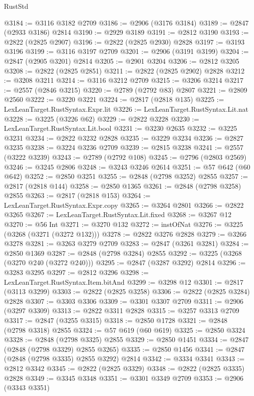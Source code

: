 \begin{lexlean}{RustStd}
\begin{coremodule}
@3184 := @3116 @3182 @2709
@3186 := @2906 (@3176 @3184)
@3189 := @2847 (@2933 @3186) @2814
@3190 := @2929 @3189
@3191 := @2812 @3190
@3193 := @2822 (@2825 @2907)
@3196 := @2822 (@2825 @2930) @2828
@3197 := @3193 @3196
@3199 := @3116 @3197 @2709
@3201 := @2906 (@3191 @3199)
@3204 := @2847 (@2905 @3201) @2814
@3205 := @2901 @3204
@3206 := @2812 @3205
@3208 := @2822 (@2825 @2851)
@3211 := @2822 (@2825 @2902) @2828
@3212 := @3208 @3211
@3214 := @3116 @3212 @2709
@3215 := @3206 @3214
@3217 := @2557 (@2846 @3215)
@3220 := @2789 (@2792 @83) @2807
@3221 := @2809 @2560
@3222 := @3220 @3221
@3224 := @2817 (@2818 @135)
@3225 := LexLeanTarget.RustSyntax.Expr.lit
@3226 := LexLeanTarget.RustSyntax.Lit.nat
@3228 := @3225 (@3226 @62)
@3229 := @2822 @3228
@3230 := LexLeanTarget.RustSyntax.Lit.bool
@3231 := @3230 @2635
@3232 := @3225 @3231
@3234 := @2822 @3232 @2828
@3235 := @3229 @3234
@3236 := @2827 @3235
@3238 := @3224 @3236 @2709
@3239 := @2815 @3238
@3241 := @2557 (@3222 @3239)
@3243 := @2789 (@2792 @108)
@3245 := @2796 (@2803 @2569)
@3246 := @3245 @2806
@3248 := @3243 @3246 @2614
@3251 := @57 @642 (@60 @642)
@3252 := @2850 @3251
@3255 := @2848 (@2798 @3252) @2855
@3257 := @2817 (@2818 @144)
@3258 := @2850 @1365
@3261 := @2848 (@2798 @3258) @2855
@3263 := @2817 (@2818 @153)
@3264 := LexLeanTarget.RustSyntax.Expr.copy
@3265 := @3264 @2801
@3266 := @2822 @3265
@3267 := LexLeanTarget.RustSyntax.Lit.fixed
@3268 := @3267 @12
@3270 := @56 Int
@3271 := @3270 @132
@3272 := instOfNat
@3276 := @3225 (@3268 (@3271 (@3272 @132)))
@3278 := @2822 @3276 @2828
@3279 := @3266 @3278
@3281 := @3263 @3279 @2709
@3283 := @2847 (@3261 @3281)
@3284 := @2850 @1369
@3287 := @2848 (@2798 @3284) @2855
@3292 := @3225 (@3268 (@3270 @240 (@3272 @240)))
@3295 := @2847 (@3287 @3292) @2814
@3296 := @3283 @3295
@3297 := @2812 @3296
@3298 := LexLeanTarget.RustSyntax.Item.bitAnd
@3299 := @3298 @12
@3301 := @2817 (@3113 @3299)
@3303 := @2822 (@2825 @3258)
@3306 := @2822 (@2825 @3284) @2828
@3307 := @3303 @3306
@3309 := @3301 @3307 @2709
@3311 := @2906 (@3297 @3309)
@3313 := @2822 @3311 @2828
@3315 := @3257 @3313 @2709
@3317 := @2847 (@3255 @3315)
@3318 := @2850 @1728
@3321 := @2848 (@2798 @3318) @2855
@3324 := @57 @619 (@60 @619)
@3325 := @2850 @3324
@3328 := @2848 (@2798 @3325) @2855
@3329 := @2850 @1451
@3334 := @2847 (@2848 (@2798 @3329) @2855 @3265)
@3335 := @2850 @1456
@3341 := @2847 (@2848 (@2798 @3335) @2855 @3292) @2814
@3342 := @3334 @3341
@3343 := @2812 @3342
@3345 := @2822 (@2825 @3329)
@3348 := @2822 (@2825 @3335) @2828
@3349 := @3345 @3348
@3351 := @3301 @3349 @2709
@3353 := @2906 (@3343 @3351)

\end{coremodule}
\end{lexlean}
